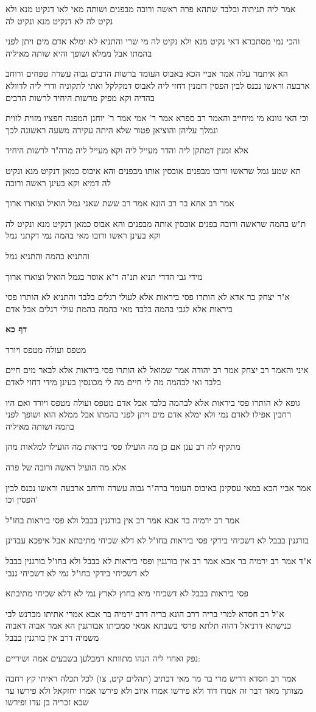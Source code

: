 \documentclass[12pt, openany]{book}
\newcommand{\sethebfont}{
\fontsize{10.5pt}{21.0pt} \selectfont
}
\newcommand{\textblock}[1]{
{\sethebfont #1\\}	
}
\newcommand{\sectname}{}
\newcommand{\newsection}[1]{
	\addcontentsline{toc}{section}{#1}
	\renewcommand{\sectname}{#1}	
	\vspace{-\baselineskip}
	\begin{center}
		\textbf{%
\fontsize{16pt}{16pt}\selectfont
			#1}
	\end{center}
	\vspace{-\baselineskip}
	\nopagebreak
}
\begin{document}
\textblock{אמר ליה תניתוה ובלבד שתהא פרה ראשה ורובה מבפנים ושותה מאי לאו דנקיט מנא ולא נקיט לה לא דנקיט מנא ונקיט לה}
\textblock{והכי נמי מסתברא דאי נקיט מנא ולא נקיט לה מי שרי והתניא לא ימלא אדם מים ויתן לפני בהמתו אבל ממלא ושופך והיא שותה מאיליה}
\textblock{הא איתמר עלה אמר אביי הכא באבוס העומד ברשות הרבים גבוה עשרה טפחים ורוחב ארבעה וראשו נכנס לבין הפסין דזמנין דחזי ליה לאבוס דמקלקל ואתי לתקוניה ודרי ליה לדוולא בהדיה וקא מפיק מרשות היחיד לרשות הרבים}
\textblock{וכי האי גוונא מי מיחייב והאמר רב ספרא אמר ר' אמי אמר ר' יוחנן המפנה חפציו מזוית לזוית ונמלך עליהן והוציאן פטור שלא היתה עקירה משעה ראשונה לכך}
\textblock{אלא זמנין דמתקן ליה והדר מעייל ליה וקא מעייל ליה מרה"ר לרשות היחיד}
\textblock{תא שמע גמל שראשו ורובו מבפנים אובסין אותו מבפנים והא איבוס כמאן דנקיט מנא ונקיט לה דמיא וקא בעינן ראשה ורובה}
\textblock{אמר רב אחא בר רב הונא אמר רב ששת שאני גמל הואיל וצוארו ארוך}
\textblock{ת"ש בהמה שראשה ורובה בפנים אובסין אותה מבפנים והא אבוס כמאן דנקיט מנא ונקיט לה וקא בעינן ראשו ורובו מאי בהמה נמי דקתני גמל}
\textblock{והתניא בהמה והתניא גמל}
\textblock{מידי גבי הדדי תניא תנ"ה ר"א אוסר בגמל הואיל וצוארו ארוך}
\textblock{א"ר יצחק בר אדא לא הותרו פסי ביראות אלא לעולי רגלים בלבד והתניא לא הותרו פסי ביראות אלא לגבי בהמה בלבד מאי בהמה בהמת עולי רגלים אבל אדם}
\newsection{דף כא}
\textblock{מטפס ועולה מטפס ויורד}
\textblock{איני והאמר רב יצחק אמר רב יהודה אמר שמואל לא הותרו פסי ביראות אלא לבאר מים חיים בלבד ואי לבהמה מה לי חיים מה לי מכונסין בעינן מידי דחזי לאדם}
\textblock{גופא לא הותרו פסי ביראות אלא לבהמה בלבד אבל אדם מטפס ועולה מטפס ויורד ואם היו רחבין אפילו לאדם נמי ולא ימלא אדם מים ויתן לפני בהמתו אבל ממלא הוא ושופך לפני בהמה ושותה מאיליה}
\textblock{מתקיף לה רב ענן אם כן מה הועילו פסי ביראות מה הועילו למלאות מהן}
\textblock{אלא מה הועיל ראשה ורובה של פרה}
\textblock{אמר אביי הכא במאי עסקינן באיבוס העומד ברה"ר גבוה עשרה ורוחב ארבעה וראשו נכנס לבין הפסין וכו'}
\textblock{אמר רב ירמיה בר אבא אמר רב אין בורגנין בבבל ולא פסי ביראות בחו"ל}
\textblock{בורגנין בבבל לא דשכיחי בידקי פסי ביראות בחו"ל לא דלא שכיחי מתיבתא אבל איפכא עבדינן}
\textblock{א"ד אמר רב ירמיה בר אבא אמר רב אין בורגנין ופסי ביראות לא בבבל ולא בחו"ל בורגנין בבבל לא דשכיחי בידקי בחו"ל נמי לא דשכיחי גנבי}
\textblock{פסי ביראות בבבל לא דשכיחי מיא בחוץ לארץ נמי לא דלא שכיחי מתיבתא}
\textblock{א"ל רב חסדא למרי בריה דרב הונא בריה דרב ירמיה בר אבא אמרי אתיתו מברנש לבי כנישתא דדניאל דהוה תלתא פרסי בשבתא אמאי סמכיתו אבורגנין הא אמר אבוה דאבוה משמיה דרב אין בורגנין בבבל}
\textblock{נפק ואחוי ליה הנהו מתוותא דמבלען בשבעים אמה ושיריים:}
\textblock{אמר רב חסדא דריש מרי בר מר מאי דכתיב (תהלים קיט, צו) לכל תכלה ראיתי קץ רחבה מצותך מאד דבר זה אמרו דוד ולא פירשו אמרו איוב ולא פירשו אמרו יחזקאל ולא פירשו עד שבא זכריה בן עדו ופירשו}
\end{document}
